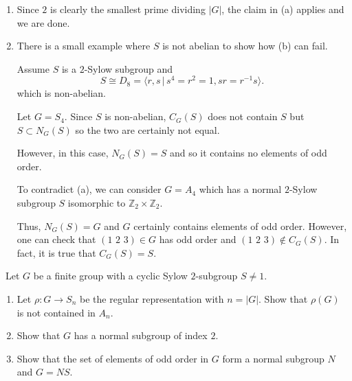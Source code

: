 \documentclass[12pt]{Qual}
\begin{document}
\begin{solution}
\begin{enumerate}[label=(\alph*)]
\begin{claim}
\begin{proof}
    Namely, $$N_G(P)=C_G(P).$$
    \end{proof}
    \end{claim}
    \item Since $2$ is clearly the smallest prime dividing $|G|$, the claim in (a) applies and we are done.
    \item There is a small example where $S$ is not abelian to show how (b) can fail.

    Assume $S$ is a $2$-Sylow subgroup and $$S\cong D_8=\langle r,s\,|\,s^4=r^2=1,sr=r^{-1}s\rangle.$$ which is non-abelian.

    Let $G=S_4.$ Since $S$ is non-abelian, $C_G(S)$ does not contain $S$ but $S\subset N_G(S)$ so the two are certainly not equal.

    However, in this case, $N_G(S)=S$ and so it contains no elements of odd order.

    To contradict (a), we can consider $G=A_4$ which has a normal $2$-Sylow subgroup $S$ isomorphic to $\mathbb{Z}_2\times\mathbb{Z}_2.$

    Thus, $N_G(S)=G$ and $G$ certainly contains elements of odd order. However, one can check that $(1\,\, 2\,\, 3)\in G$ has odd order and $(1\,\, 2\, \, 3)\notin C_G(S).$ In fact, it is true that $C_G(S)=S.$
    \end{enumerate}
\end{solution}
\newpage


\begin{problem} $\,$
Let $G$ be a finite group with a cyclic Sylow $2$-subgroup $S\not=1.$
\begin{enumerate}[label=(\alph*)]
    \item Let $\rho:G\to S_n$ be the regular representation with $n=|G|.$ Show that $\rho(G)$ is not contained in $A_n.$
    \item Show that $G$ has a normal subgroup of index $2.$
    \item Show that the set of elements of odd order in $G$ form a normal subgroup $N$ and $G=NS.$
\end{enumerate}
\end{problem}
\end{document}
